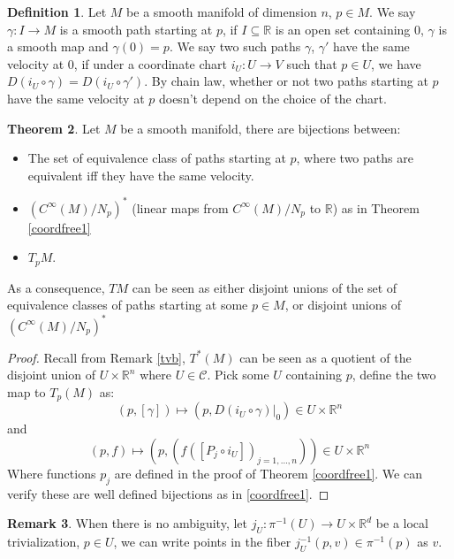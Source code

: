 \documentclass{article}
\theoremstyle{definition}
\newtheorem{thm}{Theorem}[section]
\newtheorem{dfn}[thm]{Definition}
\newtheorem{rmk}[thm]{Remark}
\begin{document}
\begin{dfn}
    Let $M$ be a smooth manifold of dimension $n$, $p\in M$. We say $\gamma:I\rightarrow M$ is a smooth path starting at $p$, if $I\subseteq\mathbb{R}$ is an open set containing $0$, $\gamma$ is a smooth map and $\gamma(0)=p$. We say two such paths $\gamma$, $\gamma'$ have the same velocity at $0$, if under a coordinate chart $i_U: U\rightarrow V$ such that $p\in U$, we have $D(i_U\circ \gamma)=D(i_U\circ \gamma')$. By chain law, whether or not two paths starting at $p$ have the same velocity at $p$ doesn't depend on the choice of the chart.
\end{dfn}

\begin{thm}\label{coordfree2}
    Let $M$ be a smooth manifold, there are bijections between:
    \begin{itemize}
        \item The set of equivalence class of paths starting at $p$, where two paths are equivalent iff they have the same velocity.
        \item $(C^\infty(M)/N_p)^*$ (linear maps from $C^\infty(M)/N_p$ to $\mathbb{R}$) as in Theorem \ref{coordfree1}
        \item $T_pM$.
    \end{itemize}
    As a consequence, $TM$ can be seen as either disjoint unions of the set of equivalence classes of paths starting at some $p\in M$, or disjoint unions of $(C^\infty(M)/N_p)^*$
\end{thm}

\begin{proof}
    Recall from Remark \ref{tvb}, $T^*(M)$ can be seen as a quotient of the disjoint union of $U\times\mathbb{R}^n$ where $U\in\mathcal{C}$. Pick some $U$ containing $p$, define the two map to $T_p(M)$ as:
    \[(p, [\gamma])\mapsto (p, D(i_U\circ \gamma)|_0)\in U\times\mathbb{R}^n\]
    and
    \[(p, f)\mapsto (p, (f([P_j\circ i_U])_{j=1,\dots, n}))\in U\times\mathbb{R}^n\]
    Where functions $p_j$ are defined in the proof of Theorem \ref{coordfree1}. We can verify these are well defined bijections as in \ref{coordfree1}.
\end{proof}

\begin{rmk}
    When there is no ambiguity, let $j_U: \pi^{-1}(U)\rightarrow U\times\mathbb{R}^d$ be a local trivialization, $p\in U$, we can write points in the fiber $j_U^{-1}(p, v)\in \pi^{-1}(p)$ as $v$.
\end{rmk}
\end{document}
